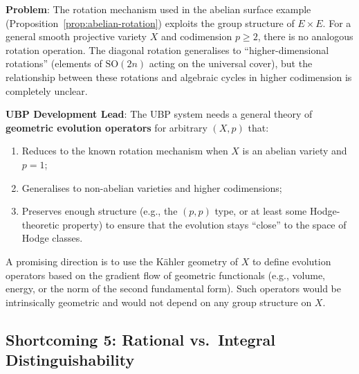\documentclass[11pt,a4paper]{article}
\theoremstyle{definition}
\theoremstyle{plain}
\begin{document}
\begin{tcolorbox}[colback=red!5, colframe=red!40!black, title={\textbf{Shortcoming 4: No Higher Codimension Rotation Mechanism}}]
\textbf{Problem}: The rotation mechanism used in the abelian surface example (Proposition~\ref{prop:abelian-rotation}) exploits the group structure of $E \times E$. For a general smooth projective variety $X$ and codimension $p \geq 2$, there is no analogous rotation operation. The diagonal rotation generalises to ``higher-dimensional rotations'' (elements of $\mathrm{SO}(2n)$ acting on the universal cover), but the relationship between these rotations and algebraic cycles in higher codimension is completely unclear.

\medskip
\textbf{UBP Development Lead}: The UBP system needs a general theory of \textbf{geometric evolution operators} for arbitrary $(X, p)$ that:
\begin{enumerate}[nosep]
\item Reduces to the known rotation mechanism when $X$ is an abelian variety and $p = 1$;
\item Generalises to non-abelian varieties and higher codimensions;
\item Preserves enough structure (e.g., the $(p,p)$ type, or at least some Hodge-theoretic property) to ensure that the evolution stays ``close'' to the space of Hodge classes.
\end{enumerate}

A promising direction is to use the K\"ahler geometry of $X$ to define evolution operators based on the gradient flow of geometric functionals (e.g., volume, energy, or the norm of the second fundamental form). Such operators would be intrinsically geometric and would not depend on any group structure on $X$.
\end{tcolorbox}

\subsection{Shortcoming 5: Rational vs.\ Integral Distinguishability}\label{sec:sc5}
\end{document}
